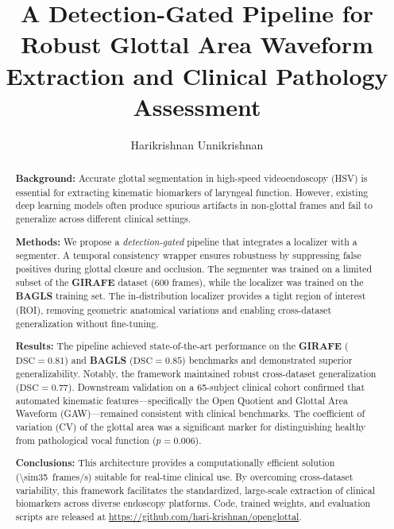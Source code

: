 \documentclass[preprint,12pt]{elsarticle}
\newcommand{\girafe}{\textbf{GIRAFE}}
\newcommand{\bagls}{\textbf{BAGLS}}
\newcommand{\gaw}{GAW}
\begin{document}
\begin{frontmatter}

\title{A Detection-Gated Pipeline for Robust Glottal Area Waveform
       Extraction and Clinical Pathology Assessment}

\author[1]{Harikrishnan Unnikrishnan}

\address[1]{Orchard Robotics, San Francisco, California 94102, USA}

\begin{abstract}

\noindent\textbf{Background:}
Accurate glottal segmentation in high-speed videoendoscopy (HSV) is
essential for extracting kinematic biomarkers of laryngeal function.
However, existing deep learning models often produce spurious artifacts in
non-glottal frames and fail to generalize across different clinical
settings.

\noindent\textbf{Methods:}
We propose a \emph{detection-gated} pipeline that integrates a
localizer with a segmenter.
A temporal consistency wrapper ensures robustness by suppressing false
positives during glottal closure and occlusion.
The segmenter was trained on a limited subset of the \girafe{} dataset
(\num{600} frames), while the localizer was trained on the \bagls{} training set.
The in-distribution localizer provides a tight region of interest
(ROI), removing geometric anatomical variations and enabling cross-dataset
generalization without fine-tuning.

\noindent\textbf{Results:}
The pipeline achieved state-of-the-art performance on the
\girafe{} ($\text{DSC}{=}0.81$) and \bagls{} ($\text{DSC}{=}0.85$) benchmarks and demonstrated
superior generalizability. Notably, the framework maintained robust cross-dataset generalization
($\text{DSC}{=}0.77$).
Downstream validation on a \num{65}-subject clinical cohort confirmed that
automated kinematic features---specifically the Open Quotient and Glottal
Area Waveform (\gaw{})---remained consistent with clinical benchmarks.
The coefficient of variation (CV) of the glottal area was a significant
marker for distinguishing healthy from pathological vocal function
($p{=}0.006$).

\noindent\textbf{Conclusions:}
This architecture provides a computationally efficient solution
(\SI{\sim35}{frames/s}) suitable for real-time clinical use.
By overcoming cross-dataset variability, this framework facilitates the
standardized, large-scale extraction of clinical biomarkers across diverse
endoscopy platforms.
Code, trained weights, and evaluation scripts are released at
\url{https://github.com/hari-krishnan/openglottal}.
\end{abstract}


\end{frontmatter}
\end{document}
